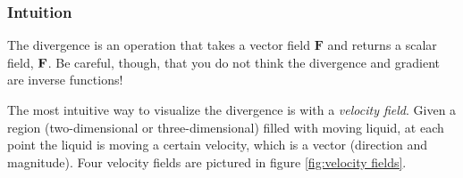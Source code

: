 \documentclass{myarticle}
\let\div\relax
\DeclareMathOperator{\div}{div}
\renewcommand{\vec}[1]{\mathbf{#1}}
\theoremstyle{nospace}
\newtheorem{old series theorem}{Theorem}
\newenvironment{series theorem}{\begin{mdframed}\begin{old series theorem}}{\end{old series theorem}\end{mdframed}}
\begin{document}
\subsubsection{Intuition} \label{sec:divergence intuition}

The divergence is an operation that takes a vector field $\vec{F}$ and returns a scalar field, $\div \vec{F}$. Be careful, though, that you do not think the divergence and gradient are inverse functions!

The most intuitive way to visualize the divergence is with a \textit{velocity field}. Given a region (two-dimensional or three-dimensional) filled with moving liquid, at each point the liquid is moving a certain velocity, which is a vector (direction and magnitude). Four velocity fields are pictured in figure \ref{fig:velocity fields}.
\end{document}
